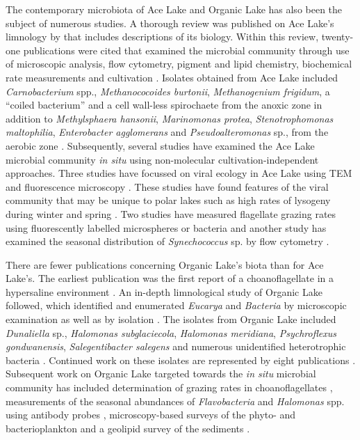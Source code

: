 The contemporary microbiota of Ace Lake and Organic Lake has also been the subject of numerous studies.
A thorough review was published on Ace Lake's limnology by \citet{Rankin1999} that includes descriptions of its biology.
Within this review, twenty-one publications were cited that examined the microbial community through use of microscopic analysis, flow cytometry, pigment and lipid chemistry, biochemical rate measurements and cultivation \cite{Rankin1999}.
Isolates obtained from Ace Lake included \emph{Carnobacterium} spp., \emph{Methanococoides burtonii}, \emph{Methanogenium frigidum}, a ``coiled bacterium'' and a cell wall-less spirochaete from the anoxic zone in addition to \emph{Methylsphaera hansonii}, \emph{Marinomonas protea}, \emph{Stenotrophomonas maltophilia}, \emph{Enterobacter agglomerans} and \emph{Pseudoalteromonas} sp., from the aerobic zone \cite{Franzmann1991a, Franzmann1991b, Franzmann1992a, Franzmann1992b, Bowman1997, Gilbert2004}. 
Subsequently, several studies have examined the Ace Lake microbial community \emph{in situ} using non-molecular cultivation-independent approaches.
Three studies have focussed on viral ecology in Ace Lake using \ac{TEM} and fluorescence microscopy \cite{Laybourn-Parry2001, Madan2005, Laybourn-Parry2007a}.
These studies have found features of the viral community that may be unique to polar lakes such as high rates of lysogeny during winter and spring \cite{Laybourn-Parry2007a}.
Two studies have measured flagellate grazing rates using fluorescently labelled microspheres or bacteria \cite{Bell2003, Laybourn-Parry2005} and another study has examined the seasonal distribution of \emph{Synechococcus} sp. by flow cytometry \cite{Powell2005}.

There are fewer publications concerning Organic Lake's biota than for Ace Lake's.
The earliest publication was the first report of a choanoflagellate in a hypersaline environment \cite{vandenHoff1986}.
An in-depth limnological study of Organic Lake followed, which identified and enumerated \emph{Eucarya} and \emph{Bacteria} by microscopic examination as well as by isolation \cite{Franzmann1987b}.
The isolates from Organic Lake included \emph{Dunaliella} sp., \emph{Halomonas subglaciecola}, \emph{Halomonas meridiana}, \emph{Psychroflexus gondwanensis}, \emph{Salegentibacter salegens} and numerous unidentified heterotrophic bacteria \cite{Franzmann1987b}.
Continued work on these isolates are represented by eight publications \cite{Burch1983, Franzmann1987a, McMeekin1988b, James1990, Dobson1991, Dobson1993, Bowman1998, McCammon2000}.
Subsequent work on Organic Lake targeted towards the \emph{in situ} microbial community has included determination of grazing rates in choanoflagellates \cite{Marchant1993}, measurements of the seasonal abundances of \emph{Flavobacteria} and \emph{Halomonas} spp. using antibody probes \cite{James1994},  microscopy-based surveys of the phyto- and bacterioplankton \cite{Roberts1996, Perriss1997} and a geolipid survey of the sediments \cite{Rogerson1996}.

